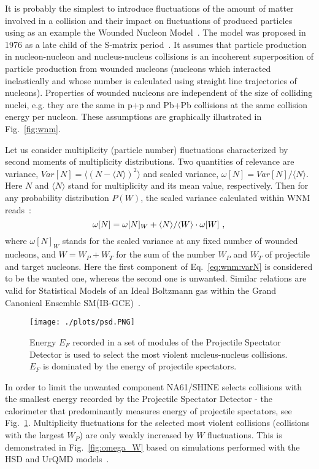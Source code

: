 \documentclass{PoS}
\begin{document}
It is probably the simplest to introduce fluctuations of the amount of matter involved in a collision
and their impact on fluctuations of produced particles using as an example 
the Wounded Nucleon Model~\cite{wnm}.
The model was proposed in 1976
as a late child of the S-matrix period~\cite{history}.
It assumes that particle production in nucleon-nucleon 
and nucleus-nucleus collisions is an incoherent superposition 
of particle production from wounded nucleons (nucleons 
which interacted inelastically and whose number is calculated using straight line trajectories of nucleons).
Properties of wounded nucleons are independent of the size of colliding
nuclei, e.g. they are the same in p+p and Pb+Pb collisions at the same
collision energy per nucleon.
These assumptions are graphically illustrated in Fig.~\ref{fig:wnm}.

Let us consider multiplicity (particle number) fluctuations characterized
by second moments of multiplicity distributions.
Two quantities of relevance are variance,
$Var[N] = \langle (N - \langle N \rangle)^2 \rangle$ and
scaled variance, $\omega[N] = Var[N]/\langle N \rangle$.
Here $N$ and $\langle N \rangle$ stand for multiplicity and its mean value, respectively.
Then for any probability distribution $P(W)$,
the scaled variance calculated within WNM reads~\cite{siq}:
\begin{equation}
\omega[N] = \omega[N]_W + \langle N \rangle / \langle W \rangle \cdot \omega[W] ~, \\ 
\label{eq:wnm:varN}
\end{equation}
where $\omega[N]_W$ stands for the scaled variance at any fixed number of wounded nucleons, and
$W = W_P + W_T$ for the sum of the number $W_P$ and $W_T$ of projectile and target nucleons.
Here the first component of Eq.~\ref{eq:wnm:varN} is considered to be the wanted one, whereas
the second one is unwanted.
Similar relations are valid for Statistical Models of an Ideal Boltzmann gas within the Grand Canonical Ensemble
SM(IB-GCE)~\cite{siq}.   

\begin{figure}[h]
	\centering
	\texttt{[image: ./plots/psd.PNG]}
	\caption[]
	{
		Energy $E_F$ recorded in a set of modules of the Projectile Spectator Detector is used to select 
		the most violent nucleus-nucleus collisions.
		$E_F$ is dominated by the energy of projectile spectators. 
	}
	\label{fig:psd}
\end{figure}

In order to limit the unwanted component NA61/SHINE selects collisions with the smallest 
energy recorded by the Projectile Spectator Detector - the calorimeter that predominantly measures
energy of projectile spectators, see Fig.~\ref{fig:psd}. 
Multiplicity fluctuations for the selected most violent collisions 
(collisions with the largest $W_P$) are only weakly increased by $W$ fluctuations. This is demonstrated
in Fig.~\ref{fig:omega_W} based on simulations performed with the HSD and UrQMD models~\cite{hsdurqmd}.
\end{document}
